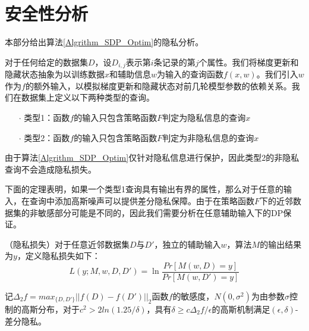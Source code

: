 \section{安全性分析}

本部分给出算法\ref{Algrithm_SDP_Optim}的隐私分析。


对于任何给定的数据集$D$，设$D_{i,j}$表示第$i$条记录的第$j$个属性。我们将梯度更新和隐藏状态抽象为以训练数据$x$和辅助信息$w$为输入的查询函数$f(x, w)$。我们引入$w$作为$f$的额外输入，以模拟梯度更新和隐藏状态对前几轮模型参数的依赖关系。我们在数据集上定义以下两种类型的查询。
\begin{itemize}
	\item [$\cdot$]类型1：函数$f$的输入只包含策略函数$F$判定为隐私信息的查询$x$
	\item [$\cdot$]类型2：函数$f$的输入只包含策略函数$F$判定为非隐私信息的查询$x$

\end{itemize}


由于算法\ref{Algrithm_SDP_Optim}仅针对隐私信息进行保护，因此类型2的非隐私查询不会造成隐私损失。

下面的定理表明，如果一个类型1查询具有输出有界的属性，那么对于任意的输入，在查询中添加高斯噪声可以提供差分隐私保障。由于在策略函数$F$下的近邻数据集的非敏感部分可能是不同的，因此我们需要分析在任意辅助输入下的DP保证。

\begin{definition}
	（隐私损失\cite{Algorithmic_Foundations_of_DP}）对于任意近邻数据集$D$与$D'$，独立的辅助输入$w$，算法$M$的输出结果为$y$，定义隐私损失如下：
	\begin{equation}
		L(y;M,w,D,D')=\ln\frac{Pr[M(w,D)=y]}{Pr[M(w,D')=y]}
	\end{equation}
\end{definition}

\begin{theorem} \label{guassian_mechanism}
	记$\Delta_2f=max_{\{D,D'\}}||f(D)-f(D')||_2$函数$f$的敏感度，$N(0,\sigma^2)$为由参数$\sigma$控制的高斯分布，对于$c^2>2ln(1.25/\delta)$，具有$\delta\geq c\Delta_2f/\epsilon$的高斯机制满足$(\epsilon,\delta)$-差分隐私。
\end{theorem}

